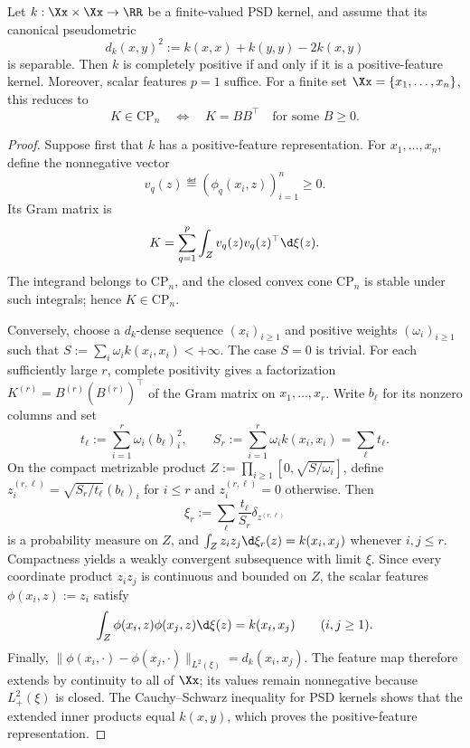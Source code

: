 \begin{prop}
\label{prop-cp-kernel-positive-features}
Let \(k:\Xx\times\Xx\to\RR\) be a finite-valued PSD kernel, and assume that its canonical pseudometric
\[
	d_k(x,y)^2:=k(x,x)+k(y,y)-2k(x,y)
\]
is separable. Then \(k\) is completely positive if and only if it is a positive-feature kernel. Moreover, scalar features \(p=1\) suffice. For a finite set \(\Xx=\{x_1,\ldots,x_n\}\), this reduces to
\[
	K\in\mathrm{CP}_n
	\quad\Longleftrightarrow\quad
	K=BB^\top\quad\text{for some }B\geq0.
\]
\end{prop}

\begin{proof}
Suppose first that \(k\) has a positive-feature representation. For \(x_1,\ldots,x_n\), define the nonnegative vector
\[
	v_q(z)\eqdef(\phi_q(x_i,z))_{i=1}^n\geq0.
\]
Its Gram matrix is
\[
	K=\sum_{q=1}^p\int_Z v_q(z)v_q(z)^\top\d\xi(z).
\]
The integrand belongs to \(\mathrm{CP}_n\), and the closed convex cone \(\mathrm{CP}_n\) is stable under such integrals; hence \(K\in\mathrm{CP}_n\).

Conversely, choose a \(d_k\)-dense sequence \((x_i)_{i\geq1}\) and positive weights \((\omega_i)_{i\geq1}\) such that \(S:=\sum_i\omega_i k(x_i,x_i)<+\infty\). The case \(S=0\) is trivial. For each sufficiently large \(r\), complete positivity gives a factorization \(K^{(r)}=B^{(r)}(B^{(r)})^\top\) of the Gram matrix on \(x_1,\ldots,x_r\). Write \(b_\ell\) for its nonzero columns and set
\[
	t_\ell:=\sum_{i=1}^r\omega_i(b_\ell)_i^2,
	\qquad
	S_r:=\sum_{i=1}^r\omega_i k(x_i,x_i)=\sum_\ell t_\ell.
\]
On the compact metrizable product \(Z:=\prod_{i\geq1}[0,\sqrt{S/\omega_i}]\), define \(z^{(r,\ell)}_i=\sqrt{S_r/t_\ell}(b_\ell)_i\) for \(i\leq r\) and \(z^{(r,\ell)}_i=0\) otherwise. Then
\[
	\xi_r:=\sum_\ell\frac{t_\ell}{S_r}\delta_{z^{(r,\ell)}}
\]
is a probability measure on \(Z\), and \(\int_Zz_i z_j\d\xi_r(z)=k(x_i,x_j)\) whenever \(i,j\leq r\). Compactness yields a weakly convergent subsequence with limit \(\xi\). Since every coordinate product \(z_i z_j\) is continuous and bounded on \(Z\), the scalar features \(\phi(x_i,z):=z_i\) satisfy
\[
	\int_Z\phi(x_i,z)\phi(x_j,z)\d\xi(z)=k(x_i,x_j)
	\qquad (i,j\geq1).
\]
Finally, \(\|\phi(x_i,\cdot)-\phi(x_j,\cdot)\|_{L^2(\xi)}=d_k(x_i,x_j)\). The feature map therefore extends by continuity to all of \(\Xx\); its values remain nonnegative because \(L^2_+(\xi)\) is closed. The Cauchy--Schwarz inequality for PSD kernels shows that the extended inner products equal \(k(x,y)\), which proves the positive-feature representation.
\end{proof}

